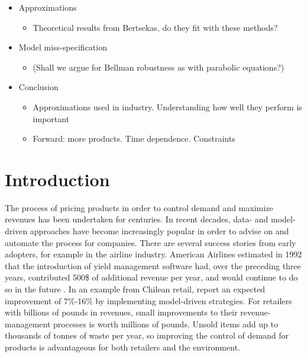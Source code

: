 \documentclass[main.tex]{subfiles}
\begin{document}
\listoftodos

\begin{itemize}
\item Approximations
  \begin{itemize}
  \item Theoretical results from Bertsekas, do they fit with these methods?
  \end{itemize}
\item Model miss-specification
  \begin{itemize}
  \item (Shall we argue for Bellman robustness as with parabolic equations?)
  \end{itemize}
\item Conclusion
  \begin{itemize}
  \item Approximations used in industry. Understanding how well they
    perform is important
  \item Forward: more products. Time dependence. Constraints
  \end{itemize}
\end{itemize}


\section{Introduction}
The process of pricing products in order to control demand and
maximize revenues has been undertaken for centuries. In recent
decades, data- and model-driven approaches have become increasingly
popular in order to advise on and automate the process for companies.
There are several success stories from early adopters, for example in
the airline industry. American Airlines estimated in 1992 that
the introduction of yield management software had, over the preceding
three years, contributed 500\$ of additional revenue per year,
and would continue to do so in the future \citep{smith1992yield}.
In an example from Chilean retail, \citet{bitran1998coordinating}
report an expected improvement of 7\%-16\% by implementing
model-driven strategies.
For retailers with billions of pounds in revenues, small
improvements to their revenue-management processes is worth millions
of pounds.
Unsold items add up to thousands of tonnes of waste per year, so
improving the control of demand for products is advantageous
for both retailers and the environment.
\end{document}
